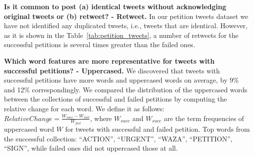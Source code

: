 \textbf{Is it common to post (a) identical tweets without acknowledging original tweets or (b) retweet? - Retweet.} In our petition tweets dataset we have not identified any duplicated tweets, i.e., tweets that are identical. However, as it is shown in the Table~\ref{tab:petition_tweets}, a number of retweets for the successful petitions is several times greater than the failed ones.

\textbf{Which word features are more representative for tweets with successful petitions? - Uppercased.} We discovered that tweets with successful petitions have more words and uppercased words on average, by 9\% and 12\% correspondingly. We compared the distribution of the uppercased words between the collections of successful and failed petitions by computing the relative change for each word. We define it as follows: $RelativeChange = \frac{W_{succ} - W_{fail}}{W_{fail}}$, where $W_{succ}$ and $W_{succ}$ are the term frequencies of uppercased word $W$ for tweets with successful and failed petition. Top words from the successful collection: ``ACTION'', ``URGENT'', ``WAZA'', ``PETITION'', ``SIGN'', while failed ones did not uppercased those at all.
